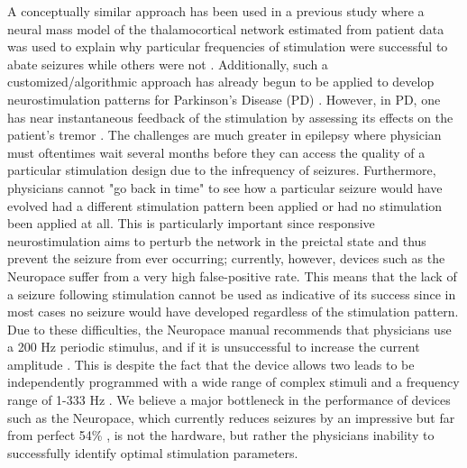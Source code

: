 \documentclass[11pt,a4paper,final]{article}
\begin{document}
A conceptually similar approach has been used in a previous study where a neural mass model of the thalamocortical network estimated from patient data was used to explain why particular frequencies of stimulation were successful to abate seizures while others were not \citep{wendling13}.
Additionally, such a customized/algorithmic approach has already begun to be applied to develop neurostimulation patterns for Parkinson's Disease (PD) \citep{holt14,grill14patent,brocker17,pena17}.
However, in PD, one has near instantaneous feedback of the stimulation by assessing its effects on the patient's tremor \citep{grill13}.
The challenges are much greater in epilepsy where physician must oftentimes wait several months before they can access the quality of a particular stimulation design due to the infrequency of seizures.
Furthermore, physicians cannot "go back in time" to see how a particular seizure would have evolved had a different stimulation pattern been applied or had no stimulation been applied at all.
This is particularly important since responsive neurostimulation aims to perturb the network in the preictal state and thus prevent the seizure from ever occurring; currently, however, devices such as the Neuropace suffer from a very high false-positive rate.
This means that the lack of a seizure following stimulation cannot be used as indicative of its success since in most cases no seizure would have developed regardless of the stimulation pattern.
Due to these difficulties, the Neuropace manual recommends that physicians use a 200 Hz periodic stimulus, and if it is unsuccessful to increase the current amplitude \citep{NP}.
This is despite the fact that the device allows two leads to be independently programmed with a wide range of complex stimuli and a frequency range of 1-333 Hz \citep{sun08}.
We believe a major bottleneck in the performance of devices such as the Neuropace, which currently reduces seizures by an impressive but far from perfect 54\% \citep{heck14}, is not the hardware, but rather the physicians inability to successfully identify optimal stimulation parameters.
\end{document}
